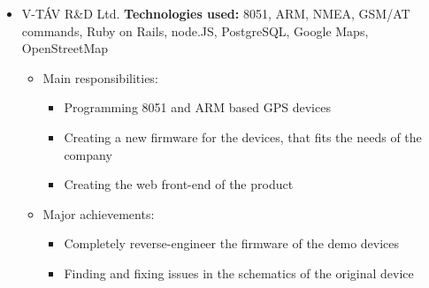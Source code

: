\documentclass[10pt,a4paper,roman]{moderncv}
\newcommand{\taglist}[1]{{\tiny \fontfamily{lmss}\selectfont \textbf{Technologies used:} #1}}
\begin{document}
{\begin{itemize}
\begin{itemize}
\begin{itemize}
\item Creating reports based on user supplied data
\item Creating and administering sister-sites
\item Keeping the business logic up-to-date with the constant changing need of the insurance companies
\item Keeping the always-changing interfaces with the insurance companies' web/services up-to-date
\end{itemize}
\item Major achievements:
\begin{itemize}
\item Designed and built the complete frontend site from ground up in only a few months
\item Designed and built a DSL to easily manage the specific quote formulas of the insurance companies
\end{itemize}
\end{itemize}
\item V-TÁV R\&D Ltd. \hfill\break
\taglist{8051, ARM, NMEA, GSM/AT commands, Ruby on Rails, node.JS, PostgreSQL, Google Maps, OpenStreetMap}
\begin{itemize}
\item Main responsibilities:
\begin{itemize}
\item Programming 8051 and ARM based GPS devices
\item Creating a new firmware for the devices, that fits the needs of the company
\item Creating the web front-end of the product
\end{itemize}
\item Major achievements:
\begin{itemize}
\item Completely reverse-engineer the firmware of the demo devices
\item Finding and fixing issues in the schematics of the original device
\end{itemize}
\end{itemize}
\end{itemize}
}
\end{document}
